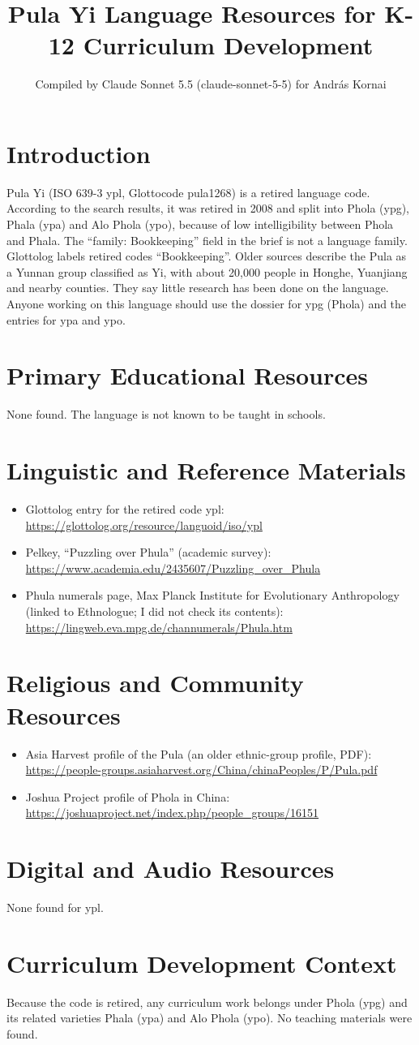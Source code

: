 \documentclass[12pt]{article}
\title{Pula Yi Language Resources for K-12 Curriculum Development}
\author{Compiled by Claude Sonnet 5.5 (claude-sonnet-5-5) for Andr\'as Kornai}
\date{}
\begin{document}
\maketitle

\section{Introduction}
Pula Yi (ISO 639-3 ypl, Glottocode pula1268) is a retired language code. According to the search results, it was retired in 2008 and split into Phola (ypg), Phala (ypa) and Alo Phola (ypo), because of low intelligibility between Phola and Phala. The ``family: Bookkeeping'' field in the brief is not a language family. Glottolog labels retired codes ``Bookkeeping''. Older sources describe the Pula as a Yunnan group classified as Yi, with about 20,000 people in Honghe, Yuanjiang and nearby counties. They say little research has been done on the language. Anyone working on this language should use the dossier for ypg (Phola) and the entries for ypa and ypo.

\section{Primary Educational Resources}
None found. The language is not known to be taught in schools.

\section{Linguistic and Reference Materials}
\begin{itemize}
\item Glottolog entry for the retired code ypl: \url{https://glottolog.org/resource/languoid/iso/ypl}
\item Pelkey, ``Puzzling over Phula'' (academic survey): \url{https://www.academia.edu/2435607/Puzzling_over_Phula}
\item Phula numerals page, Max Planck Institute for Evolutionary Anthropology (linked to Ethnologue; I did not check its contents): \url{https://lingweb.eva.mpg.de/channumerals/Phula.htm}
\end{itemize}

\section{Religious and Community Resources}
\begin{itemize}
\item Asia Harvest profile of the Pula (an older ethnic-group profile, PDF): \url{https://people-groups.asiaharvest.org/China/chinaPeoples/P/Pula.pdf}
\item Joshua Project profile of Phola in China: \url{https://joshuaproject.net/index.php/people_groups/16151}
\end{itemize}

\section{Digital and Audio Resources}
None found for ypl.

\section{Curriculum Development Context}
Because the code is retired, any curriculum work belongs under Phola (ypg) and its related varieties Phala (ypa) and Alo Phola (ypo). No teaching materials were found.
\end{document}
